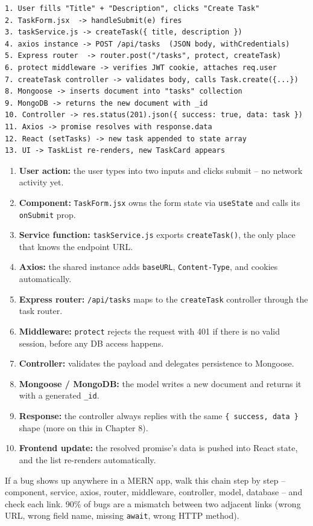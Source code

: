 \begin{diagrambox}
\begin{verbatim}
1. User fills "Title" + "Description", clicks "Create Task"
2. TaskForm.jsx  -> handleSubmit(e) fires
3. taskService.js -> createTask({ title, description })
4. axios instance -> POST /api/tasks  (JSON body, withCredentials)
5. Express router  -> router.post("/tasks", protect, createTask)
6. protect middleware -> verifies JWT cookie, attaches req.user
7. createTask controller -> validates body, calls Task.create({...})
8. Mongoose -> inserts document into "tasks" collection
9. MongoDB -> returns the new document with _id
10. Controller -> res.status(201).json({ success: true, data: task })
11. Axios -> promise resolves with response.data
12. React (setTasks) -> new task appended to state array
13. UI -> TaskList re-renders, new TaskCard appears
\end{verbatim}
\end{diagrambox}

\begin{enumerate}
  \item \textbf{User action:} the user types into two inputs and clicks submit -- no network activity yet.
  \item \textbf{Component:} \texttt{TaskForm.jsx} owns the form state via \texttt{useState} and calls its \texttt{onSubmit} prop.
  \item \textbf{Service function:} \texttt{taskService.js} exports \texttt{createTask()}, the only place that knows the endpoint URL.
  \item \textbf{Axios:} the shared instance adds \texttt{baseURL}, \texttt{Content-Type}, and cookies automatically.
  \item \textbf{Express router:} \texttt{/api/tasks} maps to the \texttt{createTask} controller through the task router.
  \item \textbf{Middleware:} \texttt{protect} rejects the request with 401 if there is no valid session, before any DB access happens.
  \item \textbf{Controller:} validates the payload and delegates persistence to Mongoose.
  \item \textbf{Mongoose / MongoDB:} the model writes a new document and returns it with a generated \texttt{\_id}.
  \item \textbf{Response:} the controller always replies with the same \texttt{\{ success, data \}} shape (more on this in Chapter 8).
  \item \textbf{Frontend update:} the resolved promise's data is pushed into React state, and the list re-renders automatically.
\end{enumerate}

\begin{tipbox}[TIP]
If a bug shows up anywhere in a MERN app, walk this chain step by step --
component, service, axios, router, middleware, controller, model, database --
and check each link. 90\% of bugs are a mismatch between two adjacent links
(wrong URL, wrong field name, missing \texttt{await}, wrong HTTP method).
\end{tipbox}
